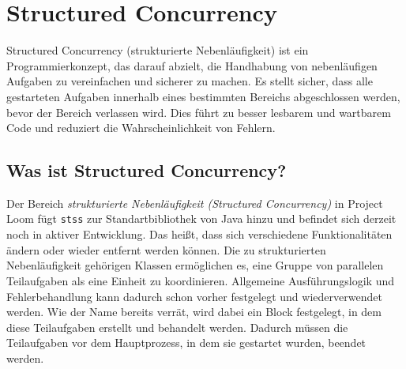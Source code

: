 \section{Structured Concurrency}                                 %
\label{sec:Structured Concurrency}

    Structured Concurrency (strukturierte Nebenläufigkeit) ist ein Programmierkonzept, das darauf abzielt, die Handhabung von nebenläufigen Aufgaben zu vereinfachen und sicherer zu machen.
    Es stellt sicher, dass alle gestarteten Aufgaben innerhalb eines bestimmten Bereichs abgeschlossen werden, bevor der Bereich verlassen wird.
    Dies führt zu besser lesbarem und wartbarem Code und reduziert die Wahrscheinlichkeit von Fehlern.

\subsection{Was ist Structured Concurrency?}
\label{subsec:WasistSC?}
    Der Bereich \emph{strukturierte Nebenläufigkeit (Structured Concurrency)} in Project Loom fügt \texttt{\Glspl{sts}} zur Standartbibliothek von Java hinzu
    und befindet sich derzeit noch in
    aktiver Entwicklung. Das heißt, dass sich verschiedene Funktionalitäten ändern oder wieder entfernt werden können.
    Die zu strukturierten Nebenläufigkeit gehörigen Klassen ermöglichen
    es, eine Gruppe von parallelen Teilaufgaben als eine Einheit zu koordinieren. Allgemeine Ausführungslogik und Fehlerbehandlung kann dadurch schon vorher festgelegt und 
    wiederverwendet werden.
    Wie der Name bereits verrät, wird dabei ein Block festgelegt, in dem diese Teilaufgaben erstellt und behandelt werden.
    Dadurch müssen die Teilaufgaben vor dem Hauptprozess, in dem sie gestartet wurden, beendet werden.
    \cite{oracle21SC}

